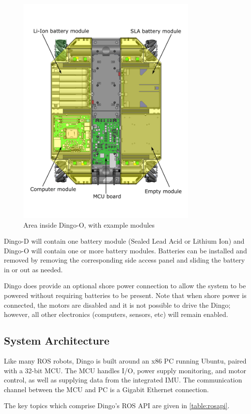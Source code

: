 \documentclass[]{clearpath-latex/clearpath-manual}
\begin{document}
\begin{figure}[pt]
  \centering
  \includegraphics[width=9.0cm]{dingo-o-int.pdf}
  \caption{Area inside Dingo-O, with example modules}
  \label{int-o}
\end{figure}

Dingo-D will contain one battery module (Sealed Lead Acid or Lithium Ion) and Dingo-O will contain one or more battery modules. Batteries can be installed and removed by removing the corresponding side access panel and sliding the battery in or out as needed.

Dingo does provide an optional shore power connection to allow the system to be powered without requiring batteries to be present. Note that when shore power is connected, the motors are disabled and it is not possible to drive the Dingo; however, all other electronics (computers, sensors, etc) will remain enabled.

\subsection{System Architecture}

Like many ROS robots, Dingo is built around an x86 PC running Ubuntu, paired with a
32-bit MCU. The MCU handles I/O, power supply monitoring, and motor control, as well as
supplying data from the integrated IMU. The communication channel
between the MCU and PC is a Gigabit Ethernet connection.

The key topics which comprise Dingo's ROS API are given in \autoref{table:rosapi}.
\end{document}
